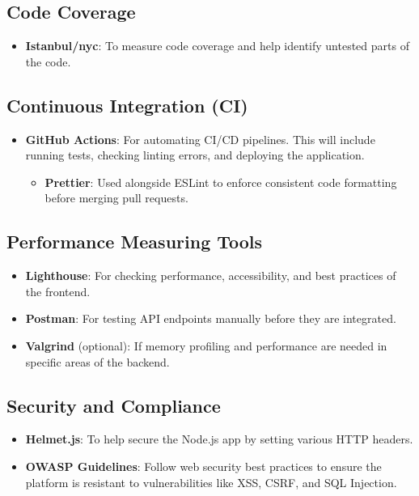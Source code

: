 \documentclass{article}
\begin{document}
\subsection{Code Coverage}
\begin{itemize}
  \item \textbf{Istanbul/nyc}: To measure code coverage and help identify untested parts of the code.
\end{itemize}

\subsection{Continuous Integration (CI)}
\begin{itemize}
  \item \textbf{GitHub Actions}: For automating CI/CD pipelines. This will include running tests, checking linting errors, and deploying the application.
  \begin{itemize}
    \item \textbf{Prettier}: Used alongside ESLint to enforce consistent code formatting before merging pull requests.
  \end{itemize}
\end{itemize}

\subsection{Performance Measuring Tools}
\begin{itemize}
  \item \textbf{Lighthouse}: For checking performance, accessibility, and best practices of the frontend.
  \item \textbf{Postman}: For testing API endpoints manually before they are integrated.
  \item \textbf{Valgrind} (optional): If memory profiling and performance are needed in specific areas of the backend.
\end{itemize}

\subsection{Security and Compliance}
\begin{itemize}
  \item \textbf{Helmet.js}: To help secure the Node.js app by setting various HTTP headers.
  \item \textbf{OWASP Guidelines}: Follow web security best practices to ensure the platform is resistant to vulnerabilities like XSS, CSRF, and SQL Injection.
\end{itemize}
\end{document}
